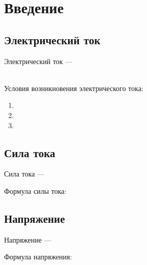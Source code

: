 \section{Введение}



\setlength\parindent{24pt}
\subsection{Электрический ток}
Электрический ток --- \hrulefill

\hrulefill
\\
Условия возникновения электрического тока:
\begin{enumerate}
    \item\hrulefill%
    \item\hrulefill%
    \item\hrulefill %
\end{enumerate}

\subsection{Сила тока}
Сила тока --- %
\hrulefill 

\hrulefill

\hrulefill 

Формула силы тока: 



\subsection{Напряжение}
Напряжение --- %
\hrulefill 

\hrulefill 

\hrulefill 

Формула напряжения: 

